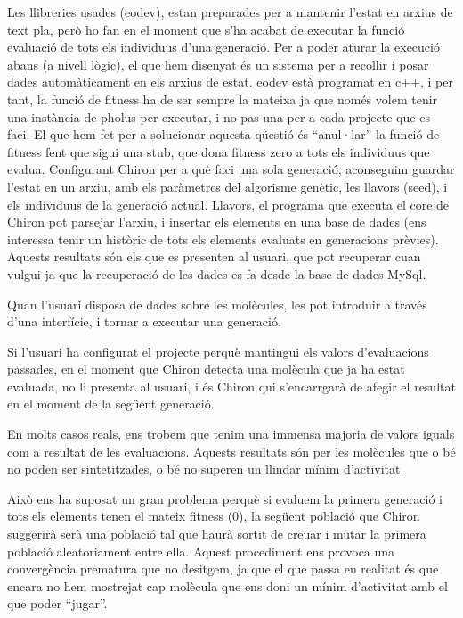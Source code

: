 \documentclass[titlepage,a4paper,12pt]{book}
\begin{document}
Les llibreries usades (eodev), estan preparades per a mantenir l'estat en arxius
de text pla, però ho fan en el moment que s'ha acabat de executar la funció
evaluació de tots els individuus d'una generació.  Per a poder aturar la
execució abans (a nivell lògic), el que hem disenyat és un sistema per a
recollir i posar dades automàticament en els arxius de estat.  eodev està
programat en c++, i per tant, la funció de fitness ha de ser sempre la mateixa
ja que només volem tenir una instància de pholus per executar, i no pas una per
a cada projecte que es faci.  El que hem fet per a solucionar aquesta qüestió és
``anul·lar'' la funció de fitness fent que sigui una stub, que dona fitness zero
a tots els individuus que evalua.  Configurant Chiron per a què faci una sola
generació, aconseguim guardar l'estat en un arxiu, amb els paràmetres del
algorisme genètic, les llavors (seed), i els individuus de la generació actual.
Llavors, el programa que executa el core de Chiron pot parsejar l'arxiu, i
insertar els elements en una base de dades (ens interessa tenir un històric de
tots els elements evaluats en generacions prèvies).  Aquests resultats són els
que es presenten al usuari, que pot recuperar cuan vulgui ja que la recuperació
de les dades es fa desde la base de dades MySql.

Quan l'usuari disposa de dades sobre les molècules, les pot introduir a través
d'una interfície, i tornar a executar una generació.

Si l'usuari ha configurat el projecte perquè mantingui els valors d'evaluacions
passades, en el moment que Chiron detecta una molècula que ja ha estat evaluada,
no li presenta al usuari, i és Chiron qui s'encarrgarà de afegir el resultat en
el moment de la següent generació.


En  molts casos reals, ens trobem que tenim una immensa majoria de valors iguals
com a resultat de les evaluacions.  Aquests resultats són per les molècules que
o bé no poden ser sintetitzades, o bé no superen un llindar mínim d'activitat.

Això ens ha suposat un gran problema perquè si evaluem la primera generació i
tots els elements tenen el mateix fitness (0), la següent població que Chiron
suggerirà serà una població tal que haurà sortit de creuar i mutar la primera
població aleatoriament entre ella.  Aquest procediment ens provoca una
convergència prematura que no desitgem, ja que el que passa en realitat és que
encara no hem mostrejat cap molècula que ens doni un mínim d'activitat amb el
que poder ``jugar''.
\end{document}
